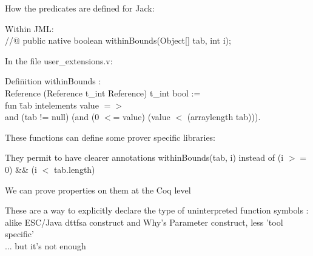 \small
How the predicates are defined for Jack:
\blist
\item Within JML:\\
  //@ public {\purple native} boolean withinBounds(Object[] tab, int i);
\item In the file user\_extensions.v:
\begin{tabbing}
  {\purple Defi}\={\purple nition} withinBounds : \+\\
  Reference \rarrow
  (Reference \rarrow t\_int \rarrow Reference) \rarrow  t\_int \rarrow bool := \\
	{\purple fun} \=  tab intelements value {\purple $=>$} \\
	\>and (tab != null) (and (0 $<$= value) (value $<$ (arraylength tab))).\\
\end{tabbing}
\elist

\small

These functions can  define some prover specific libraries:
\blist
\item They permit to have {\purple clearer} annotations
withinBounds(tab, i) instead of (i $>=$ 0) \&\& (i $<$ tab.length)
\item We can prove {\purple properties on them} at the Coq level 

\elist
These are a way to explicitly declare the type of
{\purple uninterpreted function symbols} :\\
\rarrow alike ESC/Java {\purple dttfsa} construct and
Why's {\purple Parameter} construct, less 'tool specific' \\
... but it's not enough

